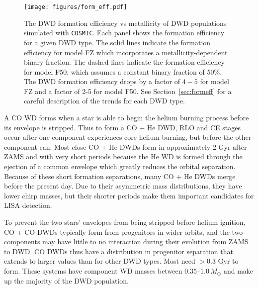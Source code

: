 \documentclass[twocolumn]{aastex631}
\newcommand{\cosmic}{\texttt{COSMIC}}
\begin{document}
\begin{figure*}
	\texttt{[image: figures/form\_eff.pdf]}
    \caption{The DWD formation efficiency vs metallicity of DWD populations simulated with \cosmic. Each panel shows the formation efficiency for a given DWD type. The solid lines indicate the formation efficiency for model FZ which incorporates a metallicity-dependent binary fraction. The dashed lines indicate the formation efficiency for model F50, which assumes a constant binary fraction of $50\%$. The DWD formation efficiency drops by a factor of $4-5$ for model FZ and a factor of 2-5 for model F50. See Section~\ref{sec:formeff} for a careful description of the trends for each DWD type.}
    \label{fig:form_eff}
\end{figure*}


A CO WD forms when a star is able to begin the helium burning process before its envelope is stripped. Thus to form a CO + He DWD, RLO and CE stages occur after one component experiences core helium burning, but before the other component can. Most close CO + He DWDs form in approximately 2 Gyr after ZAMS and with very short periods because the He WD is formed through the ejection of a common envelope which greatly reduces the orbital separation. Because of these short formation separations, many CO + He DWDs merge before the present day.
Due to their asymmetric mass distributions, they have lower chirp masses, but their shorter periods make them important candidates for LISA detection. 

To prevent the two stars' envelopes from being stripped before helium ignition, CO + CO DWDs typically form from progenitors in wider orbits, and the two components may have little to no interaction during their evolution from ZAMS to DWD. CO DWDs thus have a distribution in progenitor separation that extends to larger values than for other DWD types. Most need $> 0.3$ Gyr to form. These systems have component WD masses between $0.35$--$1.0\,M_\odot$ and make up the majority of the DWD population. 
\end{document}
